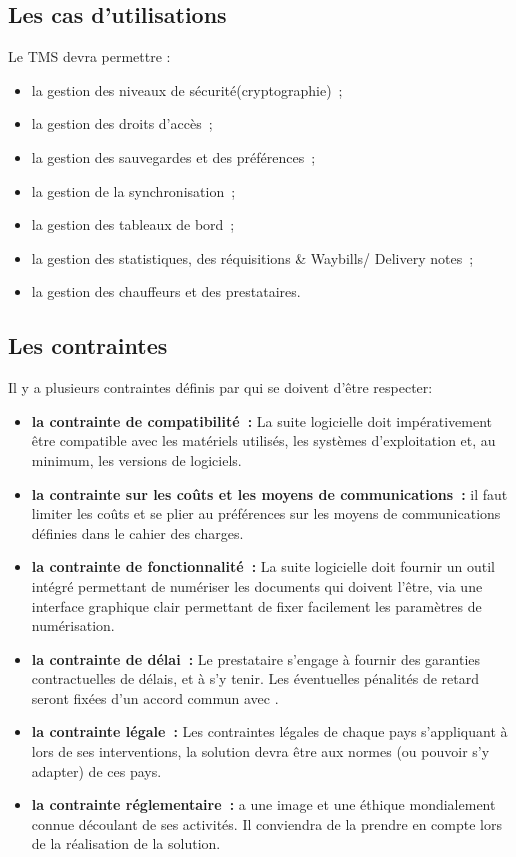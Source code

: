 \subsection{Les cas d'utilisations}
Le TMS devra permettre :
\begin{itemize}
\item la gestion des niveaux de sécurité(cryptographie)~;
\item la gestion des droits d'accès~;
\item la gestion des sauvegardes et des préférences~; 
\item la gestion de la synchronisation~;
\item la gestion des tableaux de bord~;
\item la gestion des statistiques, des réquisitions \& Waybills/ Delivery notes~;
\item la gestion des chauffeurs et des prestataires.
\end{itemize}

\subsection{Les contraintes}
Il y a plusieurs contraintes définis par \mo qui se doivent d'être respecter:
\begin{itemize}
\item \textbf{la contrainte de compatibilité~:} La suite logicielle doit impérativement être compatible avec les matériels utilisés, les systèmes d'exploitation et, au minimum, les versions de logiciels.

\item \textbf{la contrainte sur les coûts et les moyens de communications~:} il faut limiter les coûts et se plier au préférences sur les moyens de communications définies dans le cahier des charges.

\item \textbf{la contrainte de fonctionnalité~:} La suite logicielle doit fournir un outil intégré permettant de numériser les documents qui doivent l'être, via une interface graphique clair permettant de fixer facilement les paramètres de numérisation.

\item \textbf{la contrainte de délai~:} Le prestataire s'engage à fournir des garanties contractuelles de délais, et à s'y tenir. Les éventuelles pénalités de retard seront fixées d'un accord commun avec \mo.

\item \textbf{la contrainte légale~:} Les contraintes légales de chaque pays s'appliquant à \mo lors de ses interventions, la solution devra être aux normes (ou pouvoir s'y adapter) de ces pays.

\item \textbf{la contrainte réglementaire~:} \mo a une image et une éthique mondialement connue découlant de ses activités. Il conviendra de la prendre en compte lors de la réalisation de la solution.

\end{itemize}

